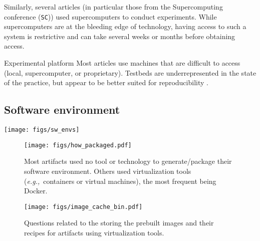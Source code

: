 \documentclass[sigconf,natbib=false]{acmart}
\newcommand{\eg}{\emph{e.g.,}}
\newcommand{\ad}{AD}
\newcommand{\aeval}{AE}
\begin{document}
Similarly, several articles (in particular those from the Supercomputing conference (\texttt{SC})) used supercomputers to conduct experiments.
While supercomputers are at the bleeding edge of technology, having access to such a system is restrictive and can take several weeks or months before obtaining access.

\begin{lesson}{Experimental platform}{}
  Most articles use machines that are difficult to access (local, supercomputer, or proprietary). 
  Testbeds are underrepresented in the state of the practice, but appear to be better suited for reproducibility \cite{nussbaum2017testbeds}.
\end{lesson}

\subsection{Software environment}\label{sec:sop:sw}

\begin{figure*}
  \centering
  \texttt{[image: figs/sw\_envs]}
  \caption{Techniques used to share the software environment in the \ad s. An artifact can use several techniques.
  }
  \label{fig:sw_envs}
\end{figure*}

\begin{figure*}
  \centering
  \begin{subfigure}{0.49\textwidth}
    \centering
    \texttt{[image: figs/how\_packaged.pdf]}
    \caption{Most artifacts used no tool or technology to generate/package their software environment.
    Others used virtualization tools (\eg\ containers or virtual machines), the most frequent being Docker.
    }
    \label{fig:techno}
  \end{subfigure}
  \hfill
  \begin{subfigure}{0.49\textwidth}
      \centering
      \texttt{[image: figs/image\_cache\_bin.pdf]}
    \caption{
      Questions related to the storing the prebuilt images and their recipes for artifacts using virtualization tools.
    }
    \label{fig:cache_bin}
  \end{subfigure}
  \caption{Tools and technologies used to generate and package the software environment for the \aeval\ (Figure \ref{fig:techno}), and the state of the image and its recipe in the case of virtual tools (Figure \ref{fig:cache_bin}).}\label{fig:techo_cache}
\end{figure*}
\end{document}
